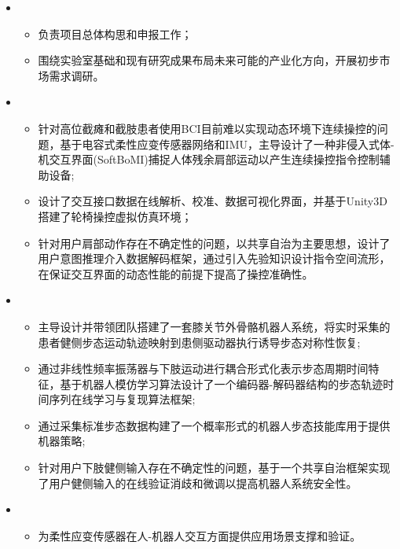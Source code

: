   \begin{itemize}[leftmargin=*]
    \item {}
    {\small
    \begin{itemize}
      \item 负责项目总体构思和申报工作；
      \item 围绕实验室基础和现有研究成果布局未来可能的产业化方向，开展初步市场需求调研。
    \end{itemize}
    }
    
    \item {}
    {\small
      \begin{itemize}
        \item 针对高位截瘫和截肢患者使用BCI目前难以实现动态环境下连续操控的问题，基于电容式柔性应变传感器网络和IMU，主导设计了一种非侵入式体-机交互界面(SoftBoMI)捕捉人体残余肩部运动以产生连续操控指令控制辅助设备;
        \item 设计了交互接口数据在线解析、校准、数据可视化界面，并基于Unity3D搭建了轮椅操控虚拟仿真环境；
        \item 针对用户肩部动作存在不确定性的问题，以共享自治为主要思想，设计了用户意图推理介入数据解码框架，通过引入先验知识设计指令空间流形，在保证交互界面的动态性能的前提下提高了操控准确性。
      \end{itemize}
    }

    \item {}
    {\small
    \begin{itemize}
      \item 主导设计并带领团队搭建了一套膝关节外骨骼机器人系统，将实时采集的患者健侧步态运动轨迹映射到患侧驱动器执行诱导步态对称性恢复;
      \item 通过非线性频率振荡器与下肢运动进行耦合形式化表示步态周期时间特征，基于机器人模仿学习算法设计了一个编码器-解码器结构的步态轨迹时间序列在线学习与复现算法框架;
      \item 通过采集标准步态数据构建了一个概率形式的机器人步态技能库用于提供机器策略;
      \item 针对用户下肢健侧输入存在不确定性的问题，基于一个共享自治框架实现了用户健侧输入的在线验证消歧和微调以提高机器人系统安全性。
    \end{itemize}
    }

    \item {}
    {\small
    \begin{itemize}
      \item 为柔性应变传感器在人-机器人交互方面提供应用场景支撑和验证。
    \end{itemize}
    }


\end{itemize}
